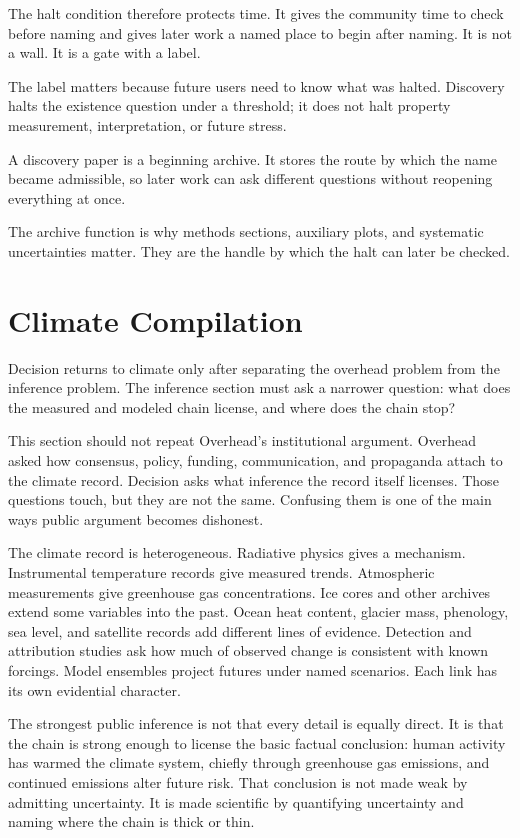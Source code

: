 The halt condition therefore protects time. It gives the community time to
check before naming and gives later work a named place to begin after naming.
It is not a wall. It is a gate with a label.

The label matters because future users need to know what was halted. Discovery
halts the existence question under a threshold; it does not halt property
measurement, interpretation, or future stress.

A discovery paper is a beginning archive. It stores the route by which the name
became admissible, so later work can ask different questions
without reopening everything at once.

The archive function is why methods sections, auxiliary plots, and systematic
uncertainties matter. They are the handle by which the halt can later be
checked.

\section{Climate Compilation}

Decision returns to climate only after separating the overhead
problem from the inference problem. The inference section must ask a narrower
question: what does the measured and modeled chain license, and where does the
chain stop?

This section should not repeat Overhead's institutional argument. Overhead
asked how consensus, policy, funding, communication, and propaganda attach to
the climate record. Decision asks what inference the record itself licenses.
Those questions touch, but they are not the same. Confusing them is one of
the main ways public argument becomes dishonest.

The climate record is heterogeneous. Radiative physics gives a mechanism.
Instrumental temperature records give measured trends. Atmospheric
measurements give greenhouse gas concentrations. Ice cores and other archives
extend some variables into the past. Ocean heat content, glacier mass,
phenology, sea level, and satellite records add different lines of evidence.
Detection and attribution studies ask how much of observed change is
consistent with known forcings. Model ensembles project futures under named
scenarios. Each link has its own evidential character.

The strongest public inference is not that every detail is equally direct. It
is that the chain is strong enough to license the basic factual conclusion:
human activity has warmed the climate system, chiefly through greenhouse gas
emissions, and continued emissions alter future risk. That conclusion is not
made weak by admitting uncertainty. It is made scientific by quantifying
uncertainty and naming where the chain is thick or thin.

